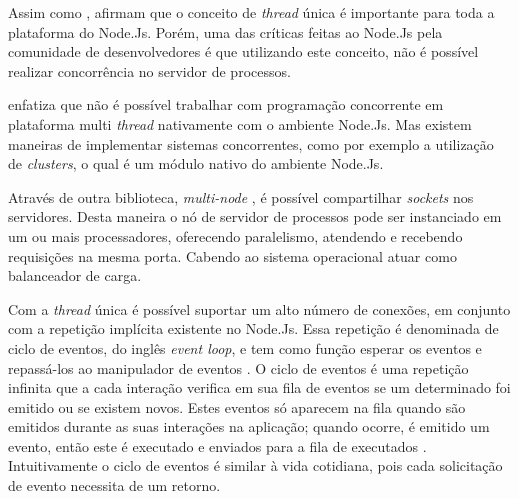   Assim como ,  afirmam que o conceito de \textit{thread} única é importante para 
  toda a plataforma do Node.Js. Porém, uma das críticas feitas ao Node.Js pela comunidade de desenvolvedores 
  é que utilizando este conceito, não é possível realizar concorrência no servidor de processos.
  
   enfatiza que não é possível trabalhar com programação 
  concorrente em plataforma multi \textit{thread} nativamente com o ambiente Node.Js. Mas existem maneiras de implementar sistemas concorrentes, 
  como por exemplo a utilização de \textit{clusters}, o qual é um módulo nativo do ambiente Node.Js.
  
  Através de outra biblioteca, \textit{multi-node} , é possível compartilhar \textit{sockets} nos servidores.
  Desta maneira o nó de servidor de processos pode ser instanciado em um ou mais processadores, oferecendo paralelismo, 
  atendendo e recebendo requisições na mesma porta. Cabendo ao sistema operacional atuar como balanceador de carga.\cite{oliveira}
  
  Com a \textit{thread} única é possível suportar um alto número de conexões, em conjunto com a repetição implícita existente no Node.Js. 
  Essa repetição é denominada de ciclo de eventos, do inglês \textit{event loop}, e tem como função esperar os eventos e repassá-los 
  ao manipulador de eventos \cite{tilkov}.
  O ciclo de eventos é uma repetição infinita que a cada interação verifica em sua 
  fila de eventos se um determinado foi emitido ou se existem novos. Estes eventos só aparecem na 
  fila quando são emitidos durante as suas interações na aplicação; quando ocorre, é emitido um evento, então este
  é executado e enviados para a fila de executados \cite{pereira}.
  Intuitivamente o ciclo de eventos é similar à vida cotidiana, pois cada solicitação de evento necessita de um retorno.
  
  
   

